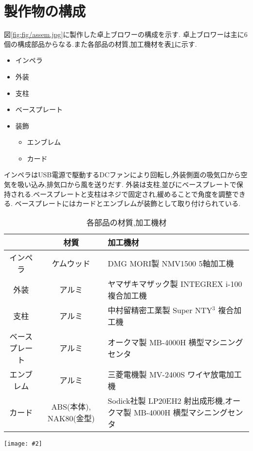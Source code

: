\documentclass[uplatex,a4j,11pt,dvipdfmx]{jsreport}
\makeatletter
\def\fgcaption{\def\@captype{figure}\caption}
\newcommand{\mfig}[3][width=15cm]{
\begin{center}
\texttt{[image: \#2]}
\fgcaption{#3 \label{fig:#2}}
\end{center}
}
\makeatother
\begin{document}
  \section{製作物の構成}
  図\ref{fig:fig/assem.jpg}に製作した卓上ブロワーの構成を示す.
  卓上ブロワーは主に6個の構成部品からなる.また各部品の材質,加工機材を表\ref{tab:parts}に示す.
  \begin{itemize}
    \item インペラ
    \item 外装
    \item 支柱
    \item ベースプレート
    \item 装飾\begin{itemize}
      \item エンブレム
      \item カード
    \end{itemize}
  \end{itemize}
  インペラはUSB電源で駆動するDCファンにより回転し,外装側面の吸気口から空気を吸い込み,排気口から風を送りだす.
  外装は支柱,並びにベースプレートで保持される.ベースプレートと支柱はネジで固定され,緩めることで角度を調整できる.
  ベースプレートにはカードとエンブレムが装飾として取り付けられている.
  \begin{table}[h]
    \caption{各部品の材質,加工機材}
    \label{tab:parts}
    \centering
    \begin{tabular}{c|cp{70mm}}
    \hline
    &材質&加工機材\\
    \hline \hline
    インペラ&ケムウッド&DMG MORI製 NMV1500 5軸加工機\\
    外装&アルミ&ヤマザキマザック製 INTEGREX i-100 複合加工機\\
    支柱&アルミ&中村留精密工業製 Super NTY$^3$ 複合加工機\\
    ベースプレート&アルミ&オークマ製 MB-4000H 横型マシニングセンタ\\
    エンブレム&アルミ&三菱電機製 MV-2400S ワイヤ放電加工機\\
    カード&ABS(本体), NAK80(金型)&Sodick社製 LP20EH2 射出成形機,オークマ製 MB-4000H 横型マシニングセンタ\\
    \hline
    \end{tabular}
  \end{table}
  \mfig[width=8cm]{fig/assem.jpg}{卓上ブロワーの構成}
  \afterpage{\clearpage}
\end{document}
